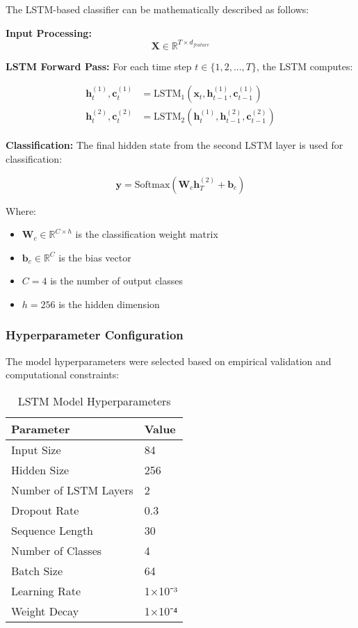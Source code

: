 \documentclass[11pt, a4paper]{article}
\begin{document}
The LSTM-based classifier can be mathematically described as follows:

\textbf{Input Processing:}
\begin{equation}
\mathbf{X} \in \mathbb{R}^{T \times d_{feature}}
\end{equation}

\textbf{LSTM Forward Pass:}
For each time step $t \in \{1, 2, ..., T\}$, the LSTM computes:

\begin{align}
\mathbf{h}_t^{(1)}, \mathbf{c}_t^{(1)} &= \text{LSTM}_1(\mathbf{x}_t, \mathbf{h}_{t-1}^{(1)}, \mathbf{c}_{t-1}^{(1)}) \\
\mathbf{h}_t^{(2)}, \mathbf{c}_t^{(2)} &= \text{LSTM}_2(\mathbf{h}_t^{(1)}, \mathbf{h}_{t-1}^{(2)}, \mathbf{c}_{t-1}^{(2)})
\end{align}

\textbf{Classification:}
The final hidden state from the second LSTM layer is used for classification:

\begin{equation}
\mathbf{y} = \text{Softmax}(\mathbf{W}_c \mathbf{h}_T^{(2)} + \mathbf{b}_c)
\end{equation}

Where:
\begin{itemize}
    \item $\mathbf{W}_c \in \mathbb{R}^{C \times h}$ is the classification weight matrix
    \item $\mathbf{b}_c \in \mathbb{R}^C$ is the bias vector
    \item $C = 4$ is the number of output classes
    \item $h = 256$ is the hidden dimension
\end{itemize}

\subsubsection{Hyperparameter Configuration}

The model hyperparameters were selected based on empirical validation and computational constraints:

\begin{table}[H]
    \centering
    \caption{LSTM Model Hyperparameters}
    \label{tab:lstm_hyperparams}
    \begin{tabular}{@{}ll@{}}
        \toprule
        \textbf{Parameter} & \textbf{Value} \\ \midrule
        Input Size & 84 \\
        Hidden Size & 256 \\
        Number of LSTM Layers & 2 \\
        Dropout Rate & 0.3 \\
        Sequence Length & 30 \\
        Number of Classes & 4 \\
        Batch Size & 64 \\
        Learning Rate & 1×10⁻³ \\
        Weight Decay & 1×10⁻⁴ \\ \bottomrule
    \end{tabular}
\end{table}
\end{document}
